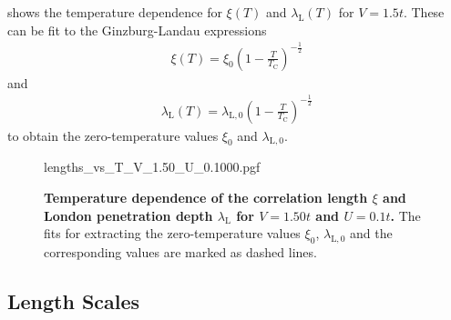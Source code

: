 \documentclass[../notes.tex]{subfiles}
\begin{document}
 shows the temperature dependence for \(\xi (T)\) and \(\lambda_{\mathrm{L}} (T)\) for \(V = 1.5t\).
These can be fit to the Ginzburg-Landau expressions
\begin{align}
	\xi(T) = \xi_0 \left(1 - \frac{T}{T_{\mathrm{C}}}\right)^{-\frac{1}{2}}
\end{align}
and
\begin{align}
	\lambda_{\mathrm{L}} (T) = 	\lambda_{\mathrm{L}, 0} \left(1 - \frac{T}{T_{\mathrm{C}}}\right)^{-\frac{1}{2}}
\end{align}
to obtain the zero-temperature values \(\xi_0\) and \(\lambda_{\mathrm{L}, 0}\).
\begin{figure}[tb]
	\centering
	{lengths_vs_T_V_1.50_U_0.1000.pgf}
	\caption[Temperature dependence of the correlation length \(\xi\) and London penetration depth \(\lambda_{\mathrm{L}}\) for \(V = 1.50t\) and \(U  = 0.1t\).]{\textbf{Temperature dependence of the correlation length \(\xi\) and London penetration depth \(\lambda_{\mathrm{L}}\) for \(V = 1.50t\) and \(U  = 0.1t\).} The fits for extracting the zero-temperature values \(\xi_0\), \(\lambda_{\mathrm{L}, 0}\) and the corresponding values are marked as dashed lines.}
	\label{fig:decorated graphene temperature fits for xi and lambda}
\end{figure}



\subsection*{Length Scales}
\end{document}

